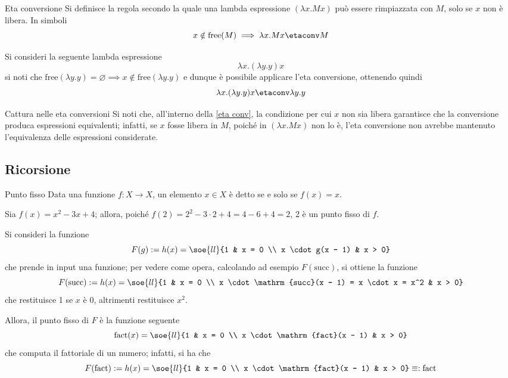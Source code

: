 \documentclass[a4paper, 12pt]{report}
\begin{document}
    \begin{frameddefn}[label={eta conv}]{Eta conversione}
        Si definisce  la regola secondo la quale una lambda espressione $(\lambda x.Mx)$ può essere rimpiazzata con $M$, solo se $x$ non è libera. In simboli $$x \notin \mathrm{free}(M) \implies \lambda x.Mx \etaconv M$$
    \end{frameddefn}

    \begin{example}
        Si consideri la seguente lambda espressione $$\lambda x.(\lambda y.y)x$$ si noti che $\mathrm{free}(\lambda y.y) = \varnothing \implies x \notin \mathrm{free}(\lambda y.y)$ e dunque è possibile applicare l'eta conversione, ottenendo quindi $$\lambda x .(\lambda y.y) x \etaconv \lambda y.y$$
    \end{example}

    \begin{framedobs}{Cattura nelle eta conversioni}
        Si noti che, all'interno della \cref{eta conv}, la condizione per cui $x$ non sia libera garantisce che la conversione produca espressioni equivalenti; infatti, se $x$ fosse libera in $M$, poiché in $(\lambda x.Mx)$ non lo è, l'eta conversione non avrebbe mantenuto l'equivalenza delle espressioni considerate.
    \end{framedobs}

    \subsection{Ricorsione}

    \begin{frameddefn}{Punto fisso}
        Data una funzione $f: X \to X$, un elemento $x \in X$ è detto  se e solo se $f(x) = x$.
    \end{frameddefn}

    \begin{example}
        Sia $f(x) = x^2 -3x +4$; allora, poiché $f(2) = 2^2 - 3 \cdot 2 + 4 = 4 - 6 + 4 = 2$, 2 è un punto fisso di $f$.
    \end{example}

    \begin{example}
        \label{fn fixed points}
        Si consideri la funzione $$F(g) := h(x) = \soe{ll}{1 & x = 0 \\ x \cdot g(x - 1) & x > 0}$$ che prende in input una funzione; per vedere come opera, calcolando ad esempio $F(\mathrm{succ})$, si ottiene la funzione $$F(\mathrm{succ}) := h(x) = \soe{ll}{1 & x = 0 \\ x \cdot \mathrm{succ}(x - 1) = x \cdot x = x^2 & x > 0}$$ che restituisce 1 se $x$ è 0, altrimenti restituisce $x^2$.

        Allora, il punto fisso di $F$ è la funzione seguente $$\mathrm{fact}(x) = \soe{ll}{1 & x = 0 \\ x \cdot \mathrm{fact}(x - 1) & x > 0}$$ che computa il fattoriale di un numero; infatti, si ha che $$F(\mathrm{fact}) := h(x) = \soe{ll}{1 & x = 0 \\ x \cdot \mathrm{fact}(x - 1) & x > 0} \equiv : \mathrm{fact}$$
    \end{example}
\end{document}
